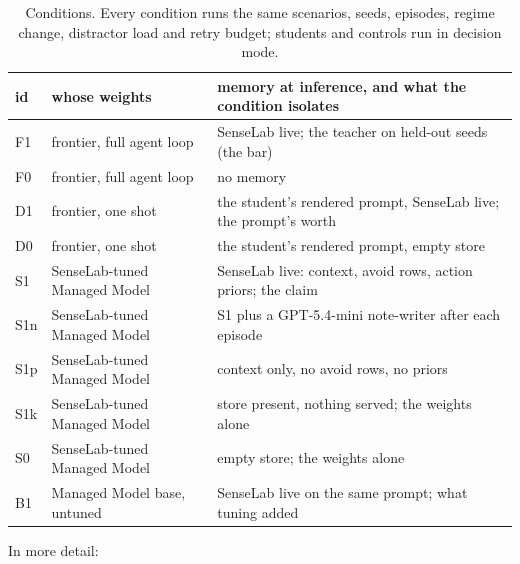 \documentclass[11pt]{article}
\newcommand{\cond}[1]{\textsf{#1}}
\begin{document}
\begin{table}[H]
\centering\small
\begin{tabular}{llp{8.2cm}}
\toprule
id & whose weights & memory at inference, and what the condition isolates \\
\midrule
\cond{F1} & frontier, full agent loop & SenseLab live; the teacher on held-out seeds (the bar) \\
\cond{F0} & frontier, full agent loop & no memory \\
\cond{D1} & frontier, one shot & the student's rendered prompt, SenseLab live; the prompt's worth \\
\cond{D0} & frontier, one shot & the student's rendered prompt, empty store \\
\cond{S1} & SenseLab-tuned Managed Model & SenseLab live: context, avoid rows, action priors; the claim \\
\cond{S1n} & SenseLab-tuned Managed Model & \cond{S1} plus a GPT-5.4-mini note-writer after each episode \\
\cond{S1p} & SenseLab-tuned Managed Model & context only, no avoid rows, no priors \\
\cond{S1k} & SenseLab-tuned Managed Model & store present, nothing served; the weights alone \\
\cond{S0} & SenseLab-tuned Managed Model & empty store; the weights alone \\
\cond{B1} & Managed Model base, untuned & SenseLab live on the same prompt; what tuning added \\
\bottomrule
\end{tabular}
\caption{Conditions. Every condition runs the same scenarios, seeds, episodes, regime change,
distractor load and retry budget; students and controls run in decision mode.}
\label{tab:conditions}
\end{table}

In more detail:
\end{document}
